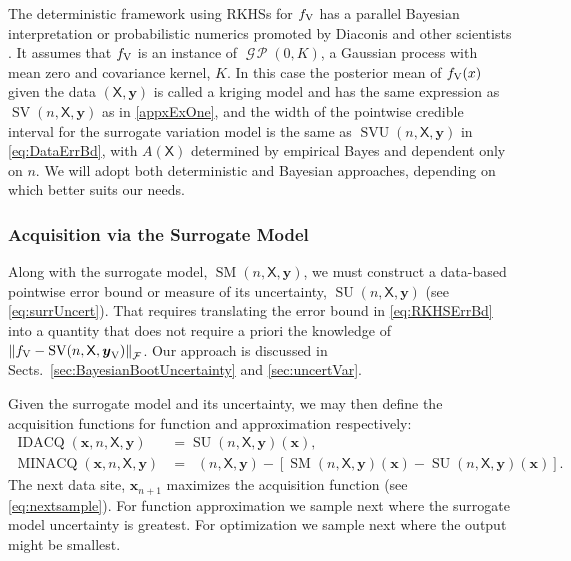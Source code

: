 \documentclass[11pt]{NSFamsart}
\DeclareMathOperator{\GP}{\mathcal{G} \! \mathcal{P}}
\DeclareMathOperator{\SURR}{SM} %
\DeclareMathOperator{\SVAR}{SV} %
\DeclareMathOperator{\SVARERR}{SVU} %
\DeclareMathOperator{\MIN}{MIN}
\DeclareMathOperator{\APPMIN}{\widehat{\MIN}}
\DeclareMathOperator{\MINVAL}{MINACQ}
\DeclareMathOperator{\IDVAL}{IDACQ}
\DeclareMathOperator{\SURRERR}{SU}
\newcommand{\VAR}{\textup{V}}
\newcommand{\mX}{\mathsf{X}}
\newcommand{\bx}{{\boldsymbol{x}}}
\newcommand{\by}{{\boldsymbol{y}}}
\newcommand{\calf}{{\mathcal{F}}}
\newcommand{\norm}[2][{}]{\ensuremath{\left \lVert #2 \right \rVert}_{#1}}
\begin{document}
The deterministic framework using RKHSs for $f_{\VAR}$ has a parallel Bayesian interpretation or probabilistic numerics promoted by Diaconis \cite{Dia88a} and other scientists \cite{BriEtal18a, OHa91a, OwhEtal19a, RasWil06a, Rit00a}. It assumes that $f_{\VAR}$ is an instance of $\GP(0,K)$, a Gaussian process with mean zero and covariance kernel, $K$. In this case the posterior mean of $f_{\VAR}(x)$ given the data $(\mX,\by)$ is called a kriging model and has the same expression as $\SVAR(n,\mX,\by)$ as in \eqref{appxExOne}, and the width of the pointwise credible interval for the surrogate variation model is the same as $\SVARERR(n,\mX,\by)$ in \eqref{eq:DataErrBd}, with $A(\mX)$ determined by empirical Bayes and dependent only on $n$. We will adopt both deterministic and Bayesian approaches, depending on which better suits our needs.



\subsubsection{Acquisition via the Surrogate Model} \label{sec:acquire}

Along with the surrogate model, $\SURR(n,\mX,\by)$, we must construct a data-based pointwise error bound or measure of its uncertainty, $\SURRERR(n,\mX,\by)$ (see \eqref{eq:surrUncert}).  That requires translating the error bound in \eqref{eq:RKHSErrBd} into a quantity that does not require a priori the knowledge of $\norm[\calf]{f_{\VAR} - \SVAR(n,\mX,\by_{\VAR})}$.  Our approach is discussed in Sects.\ \ref{sec:BayesianBootUncertainty} and \ref{sec:uncertVar}.

Given the surrogate model and its uncertainty, we may then define the acquisition functions for function and approximation respectively:
\begin{subequations} \label{eq:QOIval}
\begin{align}
\label{eq:idval}
\IDVAL(\bx,n,\mX,\by) &= \SURRERR(n,\mX,\by)(\bx), \\
\label{eq:minval}
\MINVAL(\bx,n,\mX,\by) &= \APPMIN(n,\mX,\by) - [\SURR(n,\mX,\by)(\bx) - \SURRERR(n,\mX,\by)(\bx)].
\end{align}
\end{subequations}
The next data site, $\bx_{n+1}$ maximizes the acquisition function (see \eqref{eq:nextsample}). For function approximation we sample next where the surrogate model uncertainty is greatest. For optimization we sample next where the output might be smallest.
\end{document}
